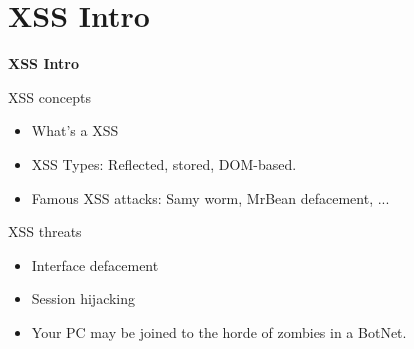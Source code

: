 
\section{XSS Intro}

{
\begin{frame}[plain]
    \begin{center}
      \Huge\bfseries
      XSS Intro
    \end{center}
\end{frame}
}

\begin{frame}{XSS concepts}
  \begin{itemize}
    \item What's a XSS
    \item XSS Types: Reflected, stored, DOM-based.
    \item Famous XSS attacks: Samy worm, MrBean defacement, ...
  \end{itemize}
\end{frame}

\begin{frame}[plain]{XSS threats}
  \begin{itemize}
    \item Interface defacement
    \item Session hijacking
    \item Your PC may be joined to the horde of zombies in a BotNet.
  \end{itemize}
\end{frame}
